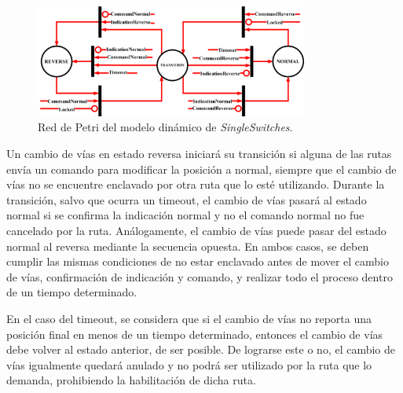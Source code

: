 	\begin{figure}[H]
		\centering
		\includegraphics[width=0.8\textwidth]{Figuras/SSW_Petri}
		\centering\caption{Red de Petri del modelo dinámico de \textit{SingleSwitches}.}
		\label{fig:SSW_Petri}
	\end{figure}
	
	Un cambio de vías en estado reversa iniciará su transición si alguna de las rutas envía un comando para modificar la posición a normal, siempre que el cambio de vías no se encuentre enclavado por otra ruta que lo esté utilizando. Durante la transición, salvo que ocurra un timeout, el cambio de vías pasará al estado normal si se confirma la indicación normal y no el comando normal no fue cancelado por la ruta. Análogamente, el cambio de vías puede pasar del estado normal al reversa mediante la secuencia opuesta. En ambos casos, se deben cumplir las mismas condiciones de no estar enclavado antes de mover el cambio de vías, confirmación de indicación y comando, y realizar todo el proceso dentro de un tiempo determinado.
	
	En el caso del timeout, se considera que si el cambio de vías no reporta una posición final en menos de un tiempo determinado, entonces el cambio de vías debe volver al estado anterior, de ser posible. De lograrse este o no, el cambio de vías igualmente quedará anulado y no podrá ser utilizado por la ruta que lo demanda, prohibiendo la habilitación de dicha ruta.

